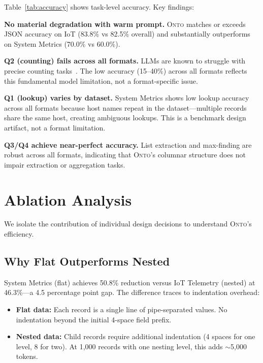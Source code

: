 \documentclass[10pt,twocolumn]{article}
\newcommand{\onto}{\textsc{Onto}\xspace}
\begin{document}
Table~\ref{tab:accuracy} shows task-level accuracy. Key findings:

\textbf{No material degradation with warm prompt.} \onto matches or exceeds JSON accuracy on IoT (83.8\% vs 82.5\% overall) and substantially outperforms on System Metrics (70.0\% vs 60.0\%).

\textbf{Q2 (counting) fails across all formats.} LLMs are known to struggle with precise counting tasks~\citep{dziri2023faith}. The low accuracy (15--40\%) across all formats reflects this fundamental model limitation, not a format-specific issue.

\textbf{Q1 (lookup) varies by dataset.} System Metrics shows low lookup accuracy across all formats because host names repeat in the dataset---multiple records share the same host, creating ambiguous lookups. This is a benchmark design artifact, not a format limitation.

\textbf{Q3/Q4 achieve near-perfect accuracy.} List extraction and max-finding are robust across all formats, indicating that \onto's columnar structure does not impair extraction or aggregation tasks.

\section{Ablation Analysis}

We isolate the contribution of individual design decisions to understand \onto's efficiency.

\subsection{Why Flat Outperforms Nested}

System Metrics (flat) achieves 50.8\% reduction versus IoT Telemetry (nested) at 46.3\%---a 4.5 percentage point gap. The difference traces to indentation overhead:

\begin{itemize}[leftmargin=*,itemsep=0.1em]
    \item \textbf{Flat data:} Each record is a single line of pipe-separated values. No indentation beyond the initial 4-space field prefix.
    
    \item \textbf{Nested data:} Child records require additional indentation (4 spaces for one level, 8 for two). At 1,000 records with one nesting level, this adds $\sim$5,000 tokens.
\end{itemize}
\end{document}
